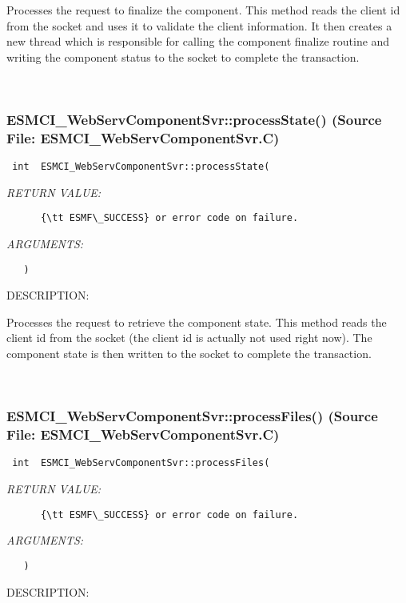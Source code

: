       Processes the request to finalize the component.  This method reads the
      client id from the socket and uses it to validate the client information.
      It then creates a new thread which is responsible for calling the
      component finalize routine and writing the component status to the
      socket to complete the transaction.
   
 
\mbox{}\hrulefill\
 
\subsubsection{ESMCI\_WebServComponentSvr::processState() (Source File: ESMCI\_WebServComponentSvr.C)}


  
\begin{verbatim} int  ESMCI_WebServComponentSvr::processState(\end{verbatim}{\em RETURN VALUE:}
\begin{verbatim}      {\tt ESMF\_SUCCESS} or error code on failure.\end{verbatim}{\em ARGUMENTS:}
\begin{verbatim}   )\end{verbatim}
{\sf DESCRIPTION:\\ }


      Processes the request to retrieve the component state.  This method
      reads the client id from the socket (the client id is actually not used
      right now). The component state is then written to the socket to
      complete the transaction.
   
 
\mbox{}\hrulefill\
 
\subsubsection{ESMCI\_WebServComponentSvr::processFiles() (Source File: ESMCI\_WebServComponentSvr.C)}


  
\begin{verbatim} int  ESMCI_WebServComponentSvr::processFiles(\end{verbatim}{\em RETURN VALUE:}
\begin{verbatim}      {\tt ESMF\_SUCCESS} or error code on failure.\end{verbatim}{\em ARGUMENTS:}
\begin{verbatim}   )\end{verbatim}
{\sf DESCRIPTION:\\ }


